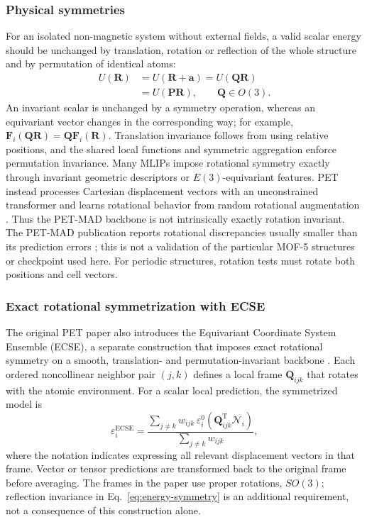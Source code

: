 \documentclass[10pt,a4paper,twocolumn]{article}
\begin{document}
\subsubsection{Physical symmetries}

For an isolated non-magnetic system without external fields, a valid scalar
energy should be unchanged by translation, rotation or reflection of the
whole structure and by permutation of identical atoms:
\begin{equation}
  \begin{aligned}
  U(\bm R)&=U(\bm R+\bm a)=U(\bm Q\bm R)
  \\
           &=U(\bm P\bm R),\qquad \bm Q\in O(3).
  \end{aligned}
  \label{eq:energy-symmetry}
\end{equation}
An invariant scalar is unchanged by a symmetry operation, whereas an
equivariant vector changes in the corresponding way; for example,
$\bm F_i(\bm Q\bm R)=\bm Q\bm F_i(\bm R)$. Translation invariance follows
from using relative positions, and the shared local functions and symmetric
aggregation enforce permutation invariance. Many MLIPs impose rotational
symmetry exactly through invariant geometric descriptors or
$E(3)$-equivariant features. PET instead processes Cartesian displacement
vectors with an unconstrained transformer and learns rotational behavior from
random rotational augmentation \cite{pet,petmad}. Thus the PET-MAD backbone
is not intrinsically exactly rotation invariant. The PET-MAD publication
reports rotational discrepancies usually smaller than its prediction errors
\cite{petmad}; this is not a validation of the particular MOF-5 structures or
checkpoint used here. For periodic structures, rotation tests must rotate
both positions and cell vectors.

\subsubsection{Exact rotational symmetrization with ECSE}

The original PET paper also introduces the Equivariant Coordinate System
Ensemble (ECSE), a separate construction that imposes exact rotational
symmetry on a smooth, translation- and permutation-invariant backbone
\cite{pet}. Each ordered noncollinear neighbor pair $(j,k)$ defines a local
frame $\bm Q_{ijk}$ that rotates with the atomic environment. For a scalar
local prediction, the symmetrized model is
\begin{equation}
  \varepsilon_i^{\mathrm{ECSE}}=
    \frac{\sum_{j\ne k}w_{ijk}\,
          \varepsilon_i^0(\bm Q_{ijk}^{\mathrm T}\mathcal N_i)}
         {\sum_{j\ne k}w_{ijk}},
  \label{eq:ecse}
\end{equation}
where the notation indicates expressing all relevant displacement vectors in
that frame. Vector or tensor predictions are transformed back to the
original frame before averaging. The frames in the paper use proper
rotations, $SO(3)$; reflection invariance in Eq.~\eqref{eq:energy-symmetry}
is an additional requirement, not a consequence of this construction alone.
\end{document}
